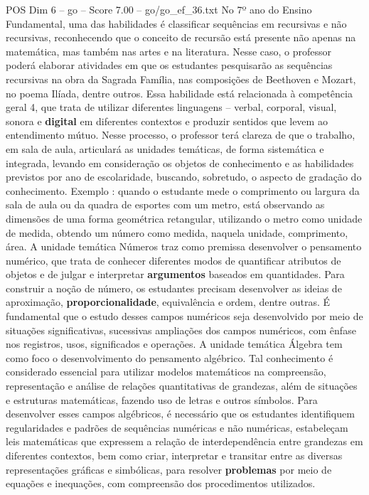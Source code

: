 \begin{textsample}{POS Dim 6 – go – Score 7.00 – go/go\_ef\_36.txt}  \label{ex:f6_pos_119}
No 7º ano do Ensino Fundamental, uma das habilidades é classificar sequências em recursivas e não recursivas, reconhecendo que o conceito de recursão está presente não apenas na matemática, mas também nas artes e na literatura.
Nesse caso, o professor poderá elaborar atividades em que os estudantes pesquisarão as sequências recursivas na obra da Sagrada Família, nas composições de Beethoven e Mozart, no poema Ilíada, dentre outros.
Essa habilidade está relacionada à competência geral 4, que trata de utilizar diferentes linguagens – verbal, corporal, visual, sonora e \textbf{digital} em diferentes contextos e produzir sentidos que levem ao entendimento mútuo.
Nesse processo, o professor terá clareza de que o trabalho, em sala de aula, articulará as unidades temáticas, de forma sistemática e integrada, levando em consideração os objetos de conhecimento e as habilidades previstos por ano de escolaridade, buscando, sobretudo, o aspecto de gradação do conhecimento.
Exemplo : quando o estudante mede o comprimento ou largura da sala de aula ou da quadra de esportes com um metro, está observando as dimensões de uma forma geométrica retangular, utilizando o metro como unidade de medida, obtendo um número como medida, naquela unidade, comprimento, área.
A unidade temática Números traz como premissa desenvolver o pensamento numérico, que trata de conhecer diferentes modos de quantificar atributos de objetos e de julgar e interpretar \textbf{argumentos} baseados em quantidades.
Para construir a noção de número, os estudantes precisam desenvolver as ideias de aproximação, \textbf{proporcionalidade}, equivalência e ordem, dentre outras.
É fundamental que o estudo desses campos numéricos seja desenvolvido por meio de situações significativas, sucessivas ampliações dos campos numéricos, com ênfase nos registros, usos, significados e operações.
A unidade temática Álgebra tem como foco o desenvolvimento do pensamento algébrico.
Tal conhecimento é considerado essencial para utilizar modelos matemáticos na compreensão, representação e análise de relações quantitativas de grandezas, além de situações e estruturas matemáticas, fazendo uso de letras e outros símbolos.
Para desenvolver esses campos algébricos, é necessário que os estudantes identifiquem regularidades e padrões de sequências numéricas e não numéricas, estabeleçam leis matemáticas que expressem a relação de interdependência entre grandezas em diferentes contextos, bem como criar, interpretar e transitar entre as diversas representações gráficas e simbólicas, para resolver \textbf{problemas} por meio de equações e inequações, com compreensão dos procedimentos utilizados.

\end{textsample}
